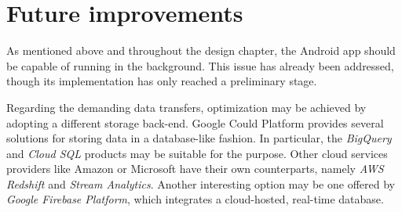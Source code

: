 \section{Future improvements}
As mentioned above and throughout the design chapter, the Android app should be capable of running in the background.
This issue has already been addressed, though its implementation has only reached a preliminary stage.


Regarding the demanding data transfers, optimization may be achieved by adopting a different storage back-end.
Google Could Platform provides several solutions for storing data in a database-like fashion.
In particular, the \emph{BigQuery} and \emph{Cloud SQL} products may be suitable for the purpose.
Other cloud services providers like Amazon or Microsoft have their own counterparts, namely \emph{AWS Redshift} and \emph{Stream Analytics}.
Another interesting option may be one offered by \emph{Google Firebase Platform}, which integrates a cloud-hosted, real-time database.
